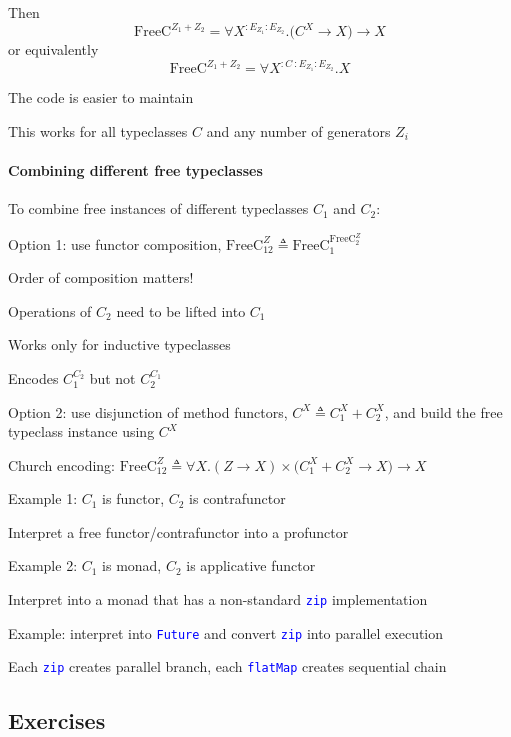 Then {\footnotesize{}
\[
\text{FreeC}^{Z_{1}+Z_{2}}=\forall X^{:E_{Z_{1}}:E_{Z_{2}}}.\big(C^{X}\rightarrow X\big)\rightarrow X
\]
}or equivalently{\footnotesize{}
\[
\text{FreeC}^{Z_{1}+Z_{2}}=\forall X^{:C~:E_{Z_{1}}:E_{Z_{2}}}.X
\]
}{\footnotesize\par}

The code is easier to maintain

This works for all typeclasses $C$ and any number of generators $Z_{i}$

\paragraph{Combining different free typeclasses}

To combine free instances of different typeclasses $C_{1}$ and $C_{2}$:

Option 1: use functor composition, $\text{FreeC}_{12}^{Z}\triangleq\text{FreeC}_{1}^{\text{FreeC}_{2}^{Z}}$

Order of composition matters!

Operations of $C_{2}$ need to be lifted into $C_{1}$

Works only for inductive typeclasses

Encodes $C_{1}^{C_{2}}$ but not $C_{2}^{C_{1}}$

Option 2: use disjunction of method functors, $C^{X}\triangleq C_{1}^{X}+C_{2}^{X}$,
and build the free typeclass instance using $C^{X}$

Church encoding: $\text{FreeC}_{12}^{Z}\triangleq\forall X.\left(Z\rightarrow X\right)\times\big(C_{1}^{X}+C_{2}^{X}\rightarrow X\big)\rightarrow X$

Example 1: $C_{1}$ is functor, $C_{2}$ is contrafunctor

Interpret a free functor/contrafunctor into a profunctor

Example 2: $C_{1}$ is monad, $C_{2}$ is applicative functor

Interpret into a monad that has a non-standard \texttt{\textcolor{blue}{\footnotesize{}zip}}
implementation

Example: interpret into \texttt{\textcolor{blue}{\footnotesize{}Future}}
and convert \texttt{\textcolor{blue}{\footnotesize{}zip}} into parallel
execution

Each \texttt{\textcolor{blue}{\footnotesize{}zip}} creates parallel
branch, each \texttt{\textcolor{blue}{\footnotesize{}flatMap}} creates
sequential chain


\subsection{Exercises}

